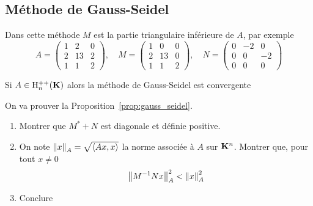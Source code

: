 \subsection{Méthode de Gauss-Seidel}

Dans cette méthode $M$ est la partie triangulaire inférieure de $A$, par exemple
\[
A = \left(\begin{array}{ccc}
1 & 2 & 0 \\
2 & 13 & 2 \\
1 & 1 & 2
\end{array}\right)
, \quad M = \left(\begin{array}{ccc}
1 & 0 & 0 \\
2 & 13 & 0 \\
1 & 1 & 2
\end{array}\right)
, \quad N = \left(\begin{array}{ccc}
0 & -2 & 0 \\
0 & 0 & -2 \\
0 & 0 & 0
\end{array}\right)
\]

\begin{proposition}
\label{prop:gauss_seidel}
Si $A \in\mathrm{H}^{++}_n(\mathbf{K})  $ alors la méthode de Gauss-Seidel est convergente
\end{proposition}

\begin{exercice}
On va prouver la Proposition~\ref{prop:gauss_seidel}.
\begin{enumerate}
\item Montrer que $M^* + N$ est diagonale et définie positive.
\item On note $\left\|x\right\|_A = \sqrt{\left\langle Ax,x\right\rangle}$ la norme associée à $A$
	sur $\mathbf{K}^{n}$. Montrer que, pour tout $x \neq 0$
\[
\left\|M^{-1}Nx\right\|_{A}^2 < \left\|x\right\|_{A}^2
\]
\item Conclure
\end{enumerate}
\end{exercice}

